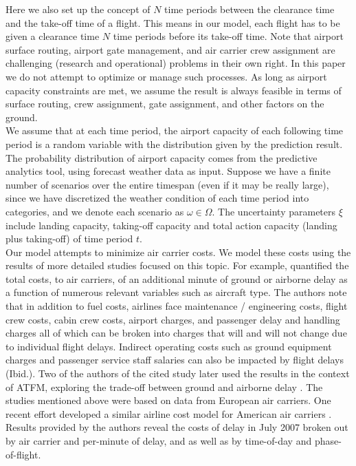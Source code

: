 \documentclass[12pt]{article}
\begin{document}
	\newline
	Here we also set up the concept of \(N\) time periods between the clearance time and the take-off time of a flight. This means in our model, each flight has to be given a clearance time \(N\) time periods before its take-off time. Note that airport surface routing, airport gate management, and air carrier crew assignment are challenging (research and operational) problems in their own right. In this paper we do not attempt to optimize or manage such processes. As long as airport capacity constraints are met, we assume the result is always feasible in terms of surface routing, crew assignment, gate assignment, and other factors on the ground.\\
	\newline %
	We assume that at each time period, the airport capacity of each following time period is a random variable with the distribution given by the prediction result. The probability distribution of airport capacity comes from the predictive analytics tool, using forecast weather data as input. Suppose we have a finite number of scenarios over the entire timespan (even if it may be really large), since we have discretized the weather condition of each time period into categories, and we denote each scenario as \(\omega \in \Omega\). The uncertainty parameters \(\xi\) include landing capacity, taking-off capacity and total action capacity (landing plus taking-off) of time period \(t\).\\
	\newline %
	Our model attempts to minimize air carrier costs.  We model these costs using the results of more detailed studies focused on this topic.  For example, \cite{true_costs} quantified the total costs, to air carriers, of an additional minute of ground or airborne delay as a function of numerous relevant variables such as aircraft type.  The authors note that in addition to fuel costs, airlines face maintenance / engineering costs, flight crew costs, cabin crew costs, airport charges, and passenger delay and handling charges all of which can be broken into charges that will and will not change due to individual flight delays.  Indirect operating costs such as ground equipment charges and passenger service staff salaries can also be impacted by flight delays (Ibid.).  Two of the authors of the cited study later used the results in the context of ATFM, exploring the trade-off between ground and airborne delay \cite{cook}.  The studies mentioned above were based on data from European air carriers.  One recent effort developed a similar airline cost model for American air carriers \cite{ferguson}.  Results provided by the authors reveal the costs of delay in July 2007 broken out by air carrier and per-minute of delay, and as well as by time-of-day and phase-of-flight.\\
\end{document}

